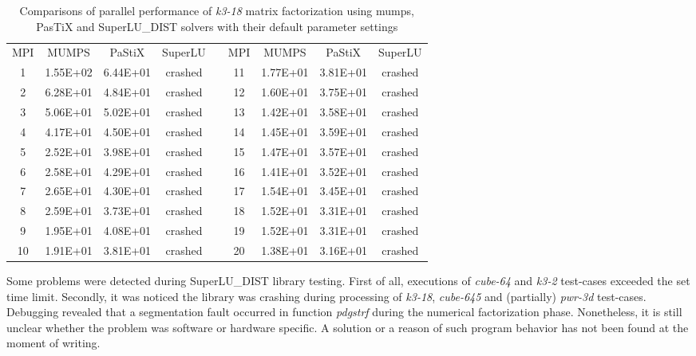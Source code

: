 \begin{table}[h!]
\centering
\begin{tabular}{|c|c|c|c|l|c|c|c|c|}
\cline{1-4} \cline{6-9}
MPI & MUMPS    & PaStiX   & SuperLU &  & MPI & MUMPS    & PaStiX   & SuperLU \\ \cline{1-4} \cline{6-9} 
1   & 1.55E+02 & 6.44E+01 & crashed &  & 11  & 1.77E+01 & 3.81E+01 & crashed \\ \cline{1-4} \cline{6-9} 
2   & 6.28E+01 & 4.84E+01 & crashed &  & 12  & 1.60E+01 & 3.75E+01 & crashed \\ \cline{1-4} \cline{6-9} 
3   & 5.06E+01 & 5.02E+01 & crashed &  & 13  & 1.42E+01 & 3.58E+01 & crashed \\ \cline{1-4} \cline{6-9} 
4   & 4.17E+01 & 4.50E+01 & crashed &  & 14  & 1.45E+01 & 3.59E+01 & crashed \\ \cline{1-4} \cline{6-9} 
5   & 2.52E+01 & 3.98E+01 & crashed &  & 15  & 1.47E+01 & 3.57E+01 & crashed \\ \cline{1-4} \cline{6-9} 
6   & 2.58E+01 & 4.29E+01 & crashed &  & 16  & 1.41E+01 & 3.52E+01 & crashed \\ \cline{1-4} \cline{6-9} 
7   & 2.65E+01 & 4.30E+01 & crashed &  & 17  & 1.54E+01 & 3.45E+01 & crashed \\ \cline{1-4} \cline{6-9} 
8   & 2.59E+01 & 3.73E+01 & crashed &  & 18  & 1.52E+01 & 3.31E+01 & crashed \\ \cline{1-4} \cline{6-9} 
9   & 1.95E+01 & 4.08E+01 & crashed &  & 19  & 1.52E+01 & 3.31E+01 & crashed \\ \cline{1-4} \cline{6-9} 
10  & 1.91E+01 & 3.81E+01 & crashed &  & 20  & 1.38E+01 & 3.16E+01 & crashed \\ \cline{1-4} \cline{6-9} 
\end{tabular}
\caption{Comparisons of parallel performance of \textit{k3-18} matrix factorization using \acrshort{mumps}, PasTiX and SuperLU\_DIST solvers with their default parameter settings}
\label{table:lc-k3-18-result}
\end{table}



Some problems were detected during  SuperLU\_DIST library testing. First of all, executions of \textit{cube-64} and \textit{k3-2} test-cases exceeded the set time limit. Secondly, it was noticed the library was crashing during processing of \textit{k3-18}, \textit{cube-645} and (partially) \textit{pwr-3d} test-cases. Debugging revealed that a segmentation fault occurred in function \textit{pdgstrf}  during the numerical factorization phase. Nonetheless, it is still unclear whether the problem was software or hardware specific. A solution or a reason of such program behavior has not been found at the moment of writing.\\


